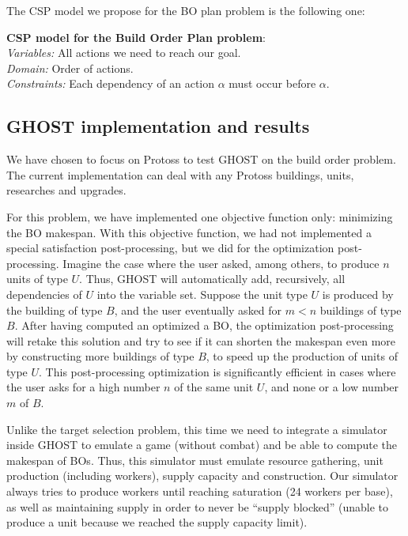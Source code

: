 \documentclass[journal]{IEEEtran}
\newcommand{\csp}{\textsc{CSP}\xspace}
\newcommand{\ghost}{\textsc{GHOST}\xspace}
\newcommand{\modelcsp}[4]%
{ \begin{trivlist}
  \item[]%
    \textbf{CSP model for #1}:\\
    \textit{Variables:} #2\\
    \textit{Domain:} #3\\
    \textit{Constraints:} #4
  \end{trivlist}%
}
\begin{document}
The \csp model we propose for the BO plan problem is the
following one:
\modelcsp{the Build Order Plan problem}%
{All actions we need to reach our goal.}%
{Order of actions.}%
{Each dependency of an action $\alpha$ must occur before $\alpha$.}

\subsection{\ghost implementation and results}

We have chosen to  focus on Protoss to test \ghost  on the build order
problem.   The  current  implementation  can  deal  with  any  Protoss
buildings, units, researches and upgrades.

For this  problem, we  have implemented  one objective  function only:
minimizing the BO makespan.  With  this objective function, we 
had not implemented  a special  satisfaction post-processing, but  we did
for the optimization post-processing. Imagine  the case where the user
asked, among  others, to produce $n$  units of type $U$.  Thus, \ghost
will automatically add, recursively, all  dependencies of $U$ into the
variable set.  Suppose  the unit type $U$ is produced  by the building
of type $B$,  and the user eventually  asked for $m <  n$ buildings of
type $B$.   After having  computed an  optimized a BO,  the optimization
post-processing will  retake this solution  and try  to see if  it can
shorten the makespan even more  by constructing more buildings of type
$B$,  to  speed  up  the  production  of  units  of  type  $U$.   This
post-processing optimization  is significantly efficient in  cases where the
user asks for a high number $n$ of the same unit $U$, and none or a low
number $m$ of $B$.

Unlike the target selection problem, this time  we need to integrate
a simulator inside  \ghost to emulate a game (without  combat) and be
able to  compute the  makespan of BOs. Thus,  this simulator
must emulate resource gathering, unit production (including workers),
supply capacity and construction.  Our simulator always tries to
produce workers  until reaching saturation  (24 workers per  base), as
well as  maintaining supply in  order to never be  ``supply blocked'' (unable  to  produce a  unit because  we  reached the  supply
capacity limit).
\end{document}
